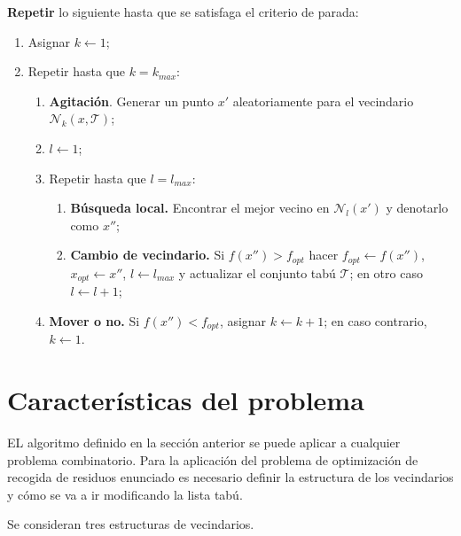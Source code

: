 \documentclass[
]{article}
\providecommand{\tightlist}{%
  \setlength{\itemsep}{0pt}\setlength{\parskip}{0pt}}
\begin{document}
\textbf{Repetir} lo siguiente hasta que se satisfaga el criterio de
parada:

\begin{enumerate}
\def\labelenumi{(\arabic{enumi})}
\tightlist
\item
  Asignar \(k\leftarrow 1\);
\item
  Repetir hasta que \(k=k_{max}\):

  \begin{enumerate}
  \def\labelenumii{(\alph{enumii})}
  \tightlist
  \item
    \textbf{Agitación}. Generar un punto \(x'\) aleatoriamente para el
    vecindario \(\mathcal{N}_k(x, \mathcal{T})\);
  \item
    \(l\leftarrow 1\);
  \item
    Repetir hasta que \(l=l_{max}\):

    \begin{enumerate}
    \def\labelenumiii{(\roman{enumiii})}
    \tightlist
    \item
      \textbf{Búsqueda local.} Encontrar el mejor vecino en
      \(\mathcal{N}_l(x')\) y denotarlo como \(x''\);
    \item
      \textbf{Cambio de vecindario.} Si \(f(x'') > f_{opt}\) hacer
      \(f_{opt}\leftarrow f(x'')\), \(x_{opt}\leftarrow x''\),
      \(l\leftarrow l_{max}\) y actualizar el conjunto tabú
      \(\mathcal{T}\); en otro caso \(l\leftarrow l + 1\);
    \end{enumerate}
  \item
    \textbf{Mover o no.} Si \(f(x'') < f_{opt}\), asignar
    \(k \leftarrow k + 1\); en caso contrario, \(k\leftarrow 1\).
  \end{enumerate}
\end{enumerate}

\hypertarget{caracteruxedsticas-del-problema}{%
\section{Características del
problema}\label{caracteruxedsticas-del-problema}}

EL algoritmo definido en la sección anterior se puede aplicar a
cualquier problema combinatorio. Para la aplicación del problema de
optimización de recogida de residuos enunciado es necesario definir la
estructura de los vecindarios y cómo se va a ir modificando la lista
tabú.

Se consideran tres estructuras de vecindarios.
\end{document}

